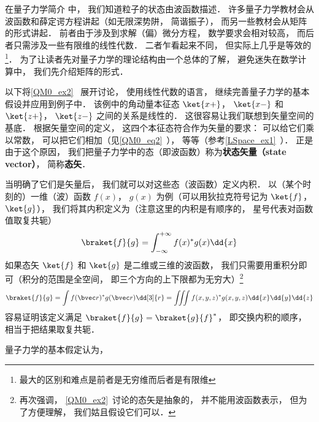 

在量子力学简介 中， 我们知道粒子的状态由波函数描述． 许多量子力学教材会从波函数和薛定谔方程讲起（如无限深势阱， 简谐振子）， 而另一些教材会从矩阵的形式讲起． 前者由于涉及到求解（偏）微分方程， 数学要求会相对较高， 而后者只需涉及一些有限维的线性代数． 二者乍看起来不同， 但实际上几乎是等效的\footnote{最大的区别和难点是前者是无穷维而后者是有限维}． 为了让读者先对量子力学的理论结构由一个总体的了解， 避免迷失在数学计算中， 我们先介绍矩阵的形式．

以下将\autoref{QM0_ex2}~ 展开讨论， 使用线性代数的语言， 继续完善量子力学的基本假设并应用到例子中． 该例中的角动量本征态 $\ket{x+}$， $\ket{x-}$ 和 $\ket{z+}$， $\ket{z-}$ 之间的关系是线性的． 这很容易让我们联想到矢量空间的基底． 根据矢量空间的定义， 这四个本征态符合作为矢量的要求： 可以给它们乘以常数， 可以把它们相加（见\autoref{QM0_eq2}~）， 等等（参考\autoref{LSpace_ex1}~）． 正是由于这个原因， 我们把量子力学中的态（即波函数）称为\textbf{状态矢量（state vector）}， 简称\textbf{态矢}．

当明确了它们是矢量后， 我们就可以对这些态（波函数）定义内积． 以（某个时刻的）一维（波）函数 $f(x)$， $g(x)$ 为例（可以用狄拉克符号记为 $\ket{f}$， $\ket{g}$）， 我们将其内积定义为（注意这里的内积是有顺序的， 星号代表对函数值取复共轭）%
\begin{equation}
\braket{f}{g} = \int_{-\infty}^{+\infty} f(x)^* g(x) \dd{x}
\end{equation}
如果态矢 $\ket{f}$ 和 $\ket{g}$ 是二维或三维的波函数， 我们只需要用重积分即可（积分的范围是全空间， 即三个方向的上下限都为无穷大）\footnote{再次强调， \autoref{QM0_ex2}~讨论的态矢是抽象的， 并不能用波函数表示， 但为了方便理解， 我们姑且假设它们可以．}
\begin{equation}
\braket{f}{g} = \int f(\bvec r)^* g(\bvec r) \dd[3]{r} = \iiint f(x, y, z)^* g(x, y, z) \dd{x}\dd{y}\dd{z}
\end{equation}
容易证明该定义满足 $\braket{f}{g} = \braket{g}{f}^*$， 即交换内积的顺序， 相当于把结果取复共轭．


量子力学的基本假定认为，





